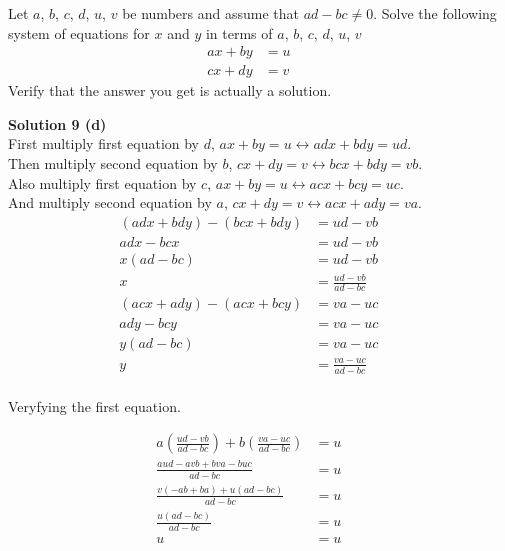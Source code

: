 \documentclass[6pt]{article}
\begin{document}
\begin{tcolorbox}[title=Problem 11, breakable]
    Let $a$, $b$, $c$, $d$, $u$, $v$ be numbers and assume that $ad - bc \not = 0$. 
    Solve the following system of equations for $x$ and $y$ in terms of 
    $a$, $b$, $c$, $d$, $u$, $v$
    \begin{align*}
        ax + by &= u && \\
        cx + dy &= v
    \end{align*}
    Verify that the answer you get is actually a solution.
\end{tcolorbox}


\textbf{Solution 9 (d)} \\
First multiply first equation by $d$, $ax + by = u \leftrightarrow adx + bdy = ud$. \\
Then multiply second equation by $b$, $cx + dy = v \leftrightarrow bcx + bdy = vb$. \\
Also multiply first equation by $c$, $ax + by = u \leftrightarrow acx + bcy = uc$. \\
And multiply second equation by $a$, $cx + dy = v \leftrightarrow acx + ady = va$. 
\begin{align*}
    (adx + bdy) - (bcx + bdy) &= ud - vb && \\
    adx - bcx &= ud - vb && \\
    x(ad - bc) &= ud - vb && \\
    x &= \frac{ud - vb}{ad - bc}
\end{align*}
\begin{align*}
    (acx + ady) - (acx + bcy) &= va - uc && \\
    ady - bcy &= va - uc && \\
    y(ad - bc) &= va - uc && \\
    y &= \frac{va - uc}{ad - bc} && \\
\end{align*}

Veryfying the first equation.

\begin{align*}
    a\left(\frac{ud - vb}{ad - bc}\right) + b\left(\frac{va - uc}{ad - bc}\right) &= u && \\
    \frac{aud - avb + bva - buc}{ad - bc} &= u && \\
    \frac{v(-ab + ba) + u(ad - bc)}{ad - bc} &= u && \\
    \frac{u(ad - bc)}{ad - bc} &= u && \\
    u &= u
\end{align*}
\end{document}
